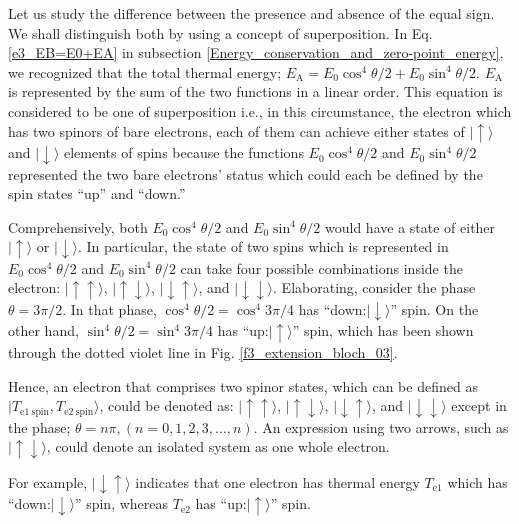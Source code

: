 \documentclass[%
 reprint,
 amsmath,amssymb,
 aps,
]{revtex4-1}
\numberwithin{equation}{section}%
\begin{document}
    Let us study the difference between the presence and absence of the equal sign. We shall distinguish both by using a concept of superposition. In Eq. \ref{e3_EB=E0+EA} in subsection \ref{Energy_conservation_and_zero-point_energy}, we recognized that the total thermal energy; $E_{\mathrm{A}} = E_{0} \cos^{4} \theta / 2 + E_{0} \sin^{4} \theta /2 $. $E_{\mathrm{A}}$ is represented by the sum of the two functions in a linear order. This equation is considered to be one of superposition i.e., in this circumstance, the electron which has two spinors of bare electrons, each of them can achieve either states of $\mid \uparrow \rangle$ and $\mid \downarrow \rangle$ elements of spins because the functions $E_{0} \cos^{4} \theta /2 $ and $E_{0} \sin^{4} \theta /2 $ represented the two bare electrons' status which could each be defined by the spin states ``up'' and ``down.'' 
    
    Comprehensively, both $E_{0} \cos^{4} \theta / 2 $ and $E_{0} \sin^{4}  \theta / 2 $ would have a state of either $\mid \uparrow \rangle$ or $\mid \downarrow \rangle$. In particular, the state of two spins which is represented in $E_{0} \cos^{4} \theta /2 $ and $E_{0} \sin^{4} \theta /2 $ can take four possible combinations inside the electron: $\mid \uparrow \uparrow \rangle$, $\mid \uparrow \downarrow \rangle$, $\mid \downarrow \uparrow \rangle$, and $\mid \downarrow \downarrow \rangle$. Elaborating, consider the phase $ \theta = 3\pi /2 $. In that phase, $\cos^{4} \theta / 2 = \cos^{4} 3\pi /4 $ has ``down:$\mid \downarrow \rangle$'' spin. On the other hand, $\sin^{4} \theta / 2 = \sin^{4} 3 \pi /4 $ has ``up:$\mid \uparrow \rangle$'' spin, which has been shown through the dotted violet line in Fig. \ref{f3_extension_bloch_03}.
        
    Hence, an electron that comprises two spinor states, which can be defined as $\mid T_{\mathrm{e1 \ spin}}, T_{\mathrm{e2 \ spin}} \rangle$, could be denoted as: $\mid \uparrow \uparrow \rangle$, $\mid \uparrow \downarrow \rangle$, $\mid \downarrow \uparrow \rangle$, and $\mid \downarrow \downarrow \rangle$ except in the phase; $\theta = n \pi, (n= 0,1,2,3,...,n)$. An expression using two arrows, such as $\mid \uparrow  \downarrow \rangle$, could denote an isolated system as one whole electron.

    For example, $\mid \downarrow  \uparrow \rangle$ indicates that one electron has thermal energy $T_{\mathrm{e1}}$ which has ``down:$\mid \downarrow \rangle$'' spin, whereas $T_{\mathrm{e2}}$ has ``up:$\mid \uparrow \rangle$'' spin.
\end{document}
